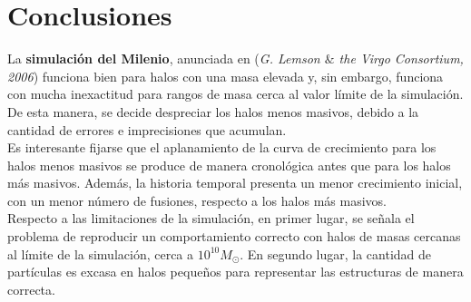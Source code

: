 \section{Conclusiones} 
\label{sec:4}

La \textbf{simulación del Milenio}\cite{6}, anunciada en (\textit{G. Lemson $\&$ the Virgo Consortium, 2006}\cite{5}) funciona bien para halos con una masa elevada y, sin embargo, funciona con mucha inexactitud para rangos de masa cerca al valor límite de la simulación. De esta manera, se decide despreciar los halos menos masivos, debido a la cantidad de errores e imprecisiones que acumulan. \\

Es interesante fijarse que el aplanamiento de la curva de crecimiento para los halos menos masivos se produce de manera cronológica antes que para los halos más masivos. Además, la historia temporal presenta un menor crecimiento inicial, con un menor número de fusiones, respecto a los halos más masivos. \\

Respecto a las limitaciones de la simulación, en primer lugar, se señala el problema de reproducir un comportamiento correcto con halos de masas cercanas al límite de la simulación, cerca a $10^{10}M_{\odot}$. En segundo lugar, la cantidad de partículas es excasa en halos pequeños para representar las estructuras de manera correcta. \\ 


